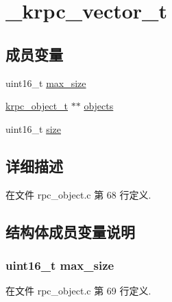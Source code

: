 \hypertarget{struct__krpc__vector__t}{}\section{\+\_\+krpc\+\_\+vector\+\_\+t}
\label{struct__krpc__vector__t}
\subsection*{成员变量}
\begin{DoxyCompactItemize}
\item 
uint16\+\_\+t \hyperlink{struct__krpc__vector__t_a58516967d6d94fcbcd0b8fc2320e581f}{max\+\_\+size}
\item 
\hyperlink{config_8h_a9c07dfc8c3b965f75b09f82fdb1bbb1e}{krpc\+\_\+object\+\_\+t} $\ast$$\ast$ \hyperlink{struct__krpc__vector__t_a2144b4060fd489bace28fc4ce06e1aaf}{objects}
\item 
uint16\+\_\+t \hyperlink{struct__krpc__vector__t_aaba88b24a21a6c70c895c0d55f4a69a0}{size}
\end{DoxyCompactItemize}


\subsection{详细描述}


在文件 rpc\+\_\+object.\+c 第 68 行定义.



\subsection{结构体成员变量说明}
\hypertarget{struct__krpc__vector__t_a58516967d6d94fcbcd0b8fc2320e581f}{}
\subsubsection[{max\+\_\+size}]{\setlength{\rightskip}{0pt plus 5cm}uint16\+\_\+t max\+\_\+size}\label{struct__krpc__vector__t_a58516967d6d94fcbcd0b8fc2320e581f}


在文件 rpc\+\_\+object.\+c 第 69 行定义.

\hypertarget{struct__krpc__vector__t_a2144b4060fd489bace28fc4ce06e1aaf}{}
